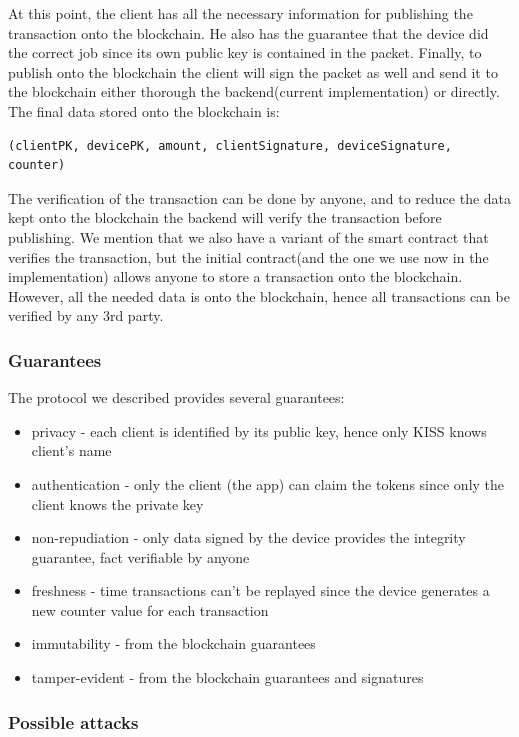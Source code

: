 \documentclass[12pt]{report}
\begin{document}
At this point, the client has all the necessary information for publishing the transaction onto the blockchain. He also has the guarantee that the device did the correct job since its own public key is contained in the packet. Finally, to publish onto the blockchain the client will sign the packet as well and send it to the blockchain either thorough the backend(current implementation) or directly. The final data stored onto the blockchain is:
\begin{lstlisting}
(clientPK, devicePK, amount, clientSignature, deviceSignature, counter)
\end{lstlisting}

The verification of the transaction can be done by anyone, and to reduce the data kept onto the blockchain the backend will verify the transaction before publishing. We mention that we also have a variant of the smart contract that verifies the transaction, but the initial contract(and the one we use now in the implementation) allows anyone to store a transaction onto the blockchain. However, all the needed data is onto the blockchain, hence all transactions can be verified by any 3rd party.


\subsubsection*{Guarantees}

The protocol we described provides several guarantees:
\begin{itemize}
    \item privacy - each client is identified by its public key, hence only KISS knows client's name
    \item authentication - only the client (the app) can claim the tokens since only the client knows the private key
    \item non-repudiation - only data signed by the device provides the integrity guarantee, fact verifiable by anyone
    \item freshness - time transactions can't be replayed since the device generates a new counter value for each transaction
    \item immutability - from the blockchain guarantees
    \item tamper-evident - from the blockchain guarantees and signatures
\end{itemize}

\subsubsection*{Possible attacks}
\end{document}
